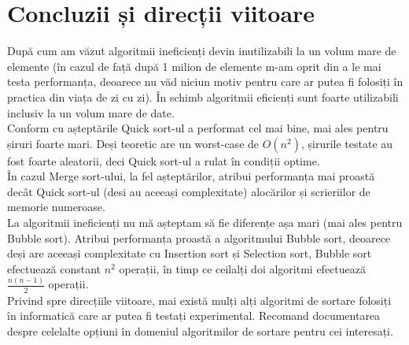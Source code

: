 \documentclass[12pt]{article}
\begin{document}
\section{Concluzii și direcții viitoare}
După cum am văzut algoritmii ineficienți devin inutilizabili la un volum mare
de elemente (în cazul de față după 1 milion de elemente m-am oprit din a le mai testa
performanța, deoarece nu văd niciun motiv pentru care ar putea fi folosiți în practica
din viața de zi cu zi). În schimb algoritmii eficienți sunt foarte utilizabili inclusiv la
un volum mare de date.\\
\indent Conform cu așteptările Quick sort-ul a performat cel mai bine, mai ales pentru
șiruri foarte mari. Deși teoretic are un worst-case de $O(n^2)$, șirurile testate au fost
foarte aleatorii, deci Quick sort-ul a rulat în condiții optime.\\
\indent În cazul Merge sort-ului, la fel așteptărilor, atribui performanța mai proastă
decât Quick sort-ul (desi au aceeași complexitate) alocărilor și scrieriilor de memorie
numeroase.\\
\indent La algoritmii ineficienți nu mă așteptam să fie diferențe așa mari (mai ales
pentru Bubble sort). Atribui performanța proastă a algoritmului Bubble sort,
deoarece deși are aceeași complexitate cu Insertion sort și Selection sort, Bubble sort
efectuează constant $n^2$
 operații, în timp ce ceilalți doi algoritmi efectuează $\frac{n(n-1)}{2}$
operații. \\
\indent Privind spre direcțiile viitoare, mai există mulți alți algoritmi de sortare folosiți în informatică care ar putea fi testați experimental. Recomand documentarea despre celelalte opțiuni în domeniul algoritmilor de sortare pentru cei interesați.

\pagebreak


\end{document}
